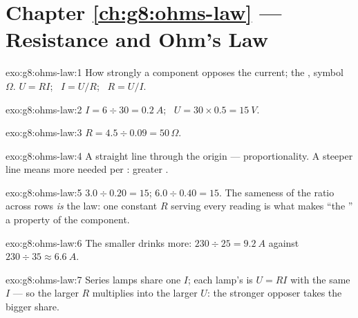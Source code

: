 \section*{Chapter \ref{ch:g8:ohms-law} --- Resistance and Ohm's Law}

\begin{solution}{exo:g8:ohms-law:1}
How strongly a component opposes the current;  the ,
symbol $\Omega$. $U = R I$; \ $I = U/R$; \ $R = U/I$.
\end{solution}

\begin{solution}{exo:g8:ohms-law:2}
$I = 6 \div 30 = \qty{0.2}{A}$; \ $U = 30 \times 0.5 =
\qty{15}{V}$.
\end{solution}

\begin{solution}{exo:g8:ohms-law:3}
$R = 4.5 \div 0.09 = 50\,\Omega$.
\end{solution}

\begin{solution}{exo:g8:ohms-law:4}
A straight line through the origin --- proportionality. A
steeper line means more  needed per : greater
.
\end{solution}

\begin{solution}{exo:g8:ohms-law:5}
$3.0 \div 0.20 = 15$; $6.0 \div 0.40 = 15$. The sameness of the
ratio across rows \emph{is} the law: one constant $R$ serving
every reading is what makes ``the '' a property of
the component.
\end{solution}

\begin{solution}{exo:g8:ohms-law:6}
The smaller  drinks more: $230 \div 25 =
\qty{9.2}{A}$ against $230 \div 35 \approx \qty{6.6}{A}$.
\end{solution}

\begin{solution}{exo:g8:ohms-law:7}
Series lamps share one $I$; each lamp's  is $U = R I$
with the same $I$ --- so the larger $R$ multiplies into the
larger $U$: the stronger opposer takes the bigger share.
\end{solution}

